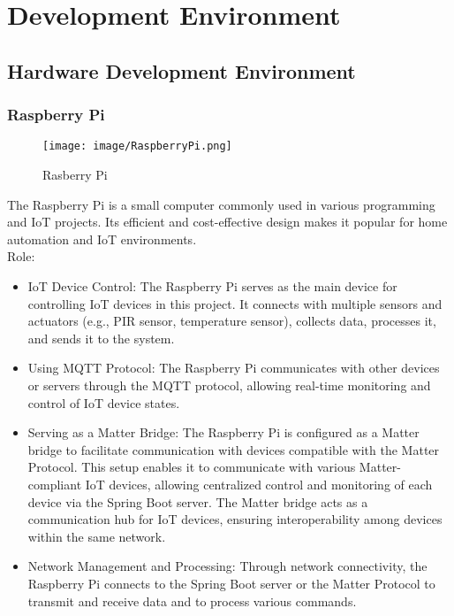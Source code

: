 \documentclass[conference]{IEEEtran}
\begin{document}
\section{Development Environment}

\subsection{Hardware Development Environment}

\subsubsection{Raspberry Pi}
\begin{figure}[h!]
    \centering
    \texttt{[image: image/RaspberryPi.png]}
\caption{Rasberry Pi}
    \label{fig:enter-label}
\end{figure}

\noindent The Raspberry Pi is a small computer commonly used in various programming and IoT projects. Its efficient and cost-effective design makes it popular for home automation and IoT environments.\\

Role:
\begin{itemize}
    \item IoT Device Control: The Raspberry Pi serves as the main device for controlling IoT devices in this project. It connects with multiple sensors and actuators (e.g., PIR sensor, temperature sensor), collects data, processes it, and sends it to the system.\\
    \item Using MQTT Protocol: The Raspberry Pi communicates with other devices or servers through the MQTT protocol, allowing real-time monitoring and control of IoT device states.\\
    \item Serving as a Matter Bridge: The Raspberry Pi is configured as a Matter bridge to facilitate communication with devices compatible with the Matter Protocol. This setup enables it to communicate with various Matter-compliant IoT devices, allowing centralized control and monitoring of each device via the Spring Boot server. The Matter bridge acts as a communication hub for IoT devices, ensuring interoperability among devices within the same network.\\
    \item Network Management and Processing: Through network connectivity, the Raspberry Pi connects to the Spring Boot server or the Matter Protocol to transmit and receive data and to process various commands.\\
\end{itemize}
\end{document}
